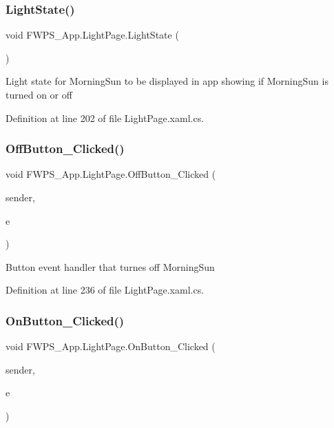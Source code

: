 \subsubsection{\texorpdfstring{Light\+State()}{LightState()}}
{\footnotesize\ttfamily void F\+W\+P\+S\+\_\+\+App.\+Light\+Page.\+Light\+State (\begin{DoxyParamCaption}{ }\end{DoxyParamCaption})\hspace{0.3cm}{\ttfamily [private]}}

Light state for Morning\+Sun to be displayed in app showing if Morning\+Sun is turned on or off 

Definition at line 202 of file Light\+Page.\+xaml.\+cs.

\mbox{\label{class_f_w_p_s___app_1_1_light_page_a9be94c8345ecaeae99d5edc9c085c456}} 
\subsubsection{\texorpdfstring{Off\+Button\+\_\+\+Clicked()}{OffButton\_Clicked()}}
{\footnotesize\ttfamily void F\+W\+P\+S\+\_\+\+App.\+Light\+Page.\+Off\+Button\+\_\+\+Clicked (\begin{DoxyParamCaption}\item[{object}]{sender,  }\item[{Event\+Args}]{e }\end{DoxyParamCaption})\hspace{0.3cm}{\ttfamily [private]}}

Button event handler that turnes off Morning\+Sun 

Definition at line 236 of file Light\+Page.\+xaml.\+cs.

\mbox{\label{class_f_w_p_s___app_1_1_light_page_a516f001270814260dc23efb76923c866}} 
\subsubsection{\texorpdfstring{On\+Button\+\_\+\+Clicked()}{OnButton\_Clicked()}}
{\footnotesize\ttfamily void F\+W\+P\+S\+\_\+\+App.\+Light\+Page.\+On\+Button\+\_\+\+Clicked (\begin{DoxyParamCaption}\item[{object}]{sender,  }\item[{Event\+Args}]{e }\end{DoxyParamCaption})\hspace{0.3cm}{\ttfamily [private]}}

